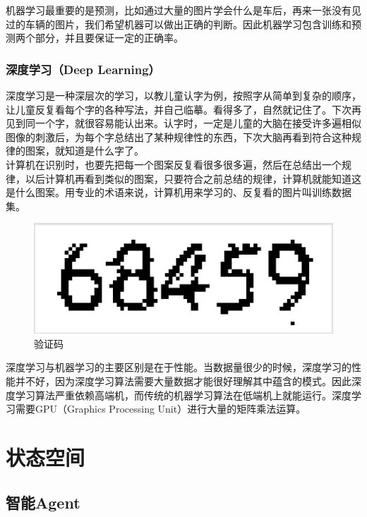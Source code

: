 机器学习最重要的是预测，比如通过大量的图片学会什么是车后，再来一张没有见过的车辆的图片，我们希望机器可以做出正确的判断。因此机器学习包含训练和预测两个部分，并且要保证一定的正确率。\\

\subsubsection{深度学习（Deep Learning）}

深度学习是一种深层次的学习，以教儿童认字为例，按照字从简单到复杂的顺序，让儿童反复看每个字的各种写法，并自己临摹。看得多了，自然就记住了。下次再见到同一个字，就很容易能认出来。认字时，一定是儿童的大脑在接受许多遍相似图像的刺激后，为每个字总结出了某种规律性的东西，下次大脑再看到符合这种规律的图案，就知道是什么字了。\\

计算机在识别时，也要先把每一个图案反复看很多很多遍，然后在总结出一个规律，以后计算机再看到类似的图案，只要符合之前总结的规律，计算机就能知道这是什么图案。用专业的术语来说，计算机用来学习的、反复看的图片叫训练数据集。

\begin{figure}[H]
    \centering
    \includegraphics[scale=0.5]{img/C1/1-1/2.png}
    \caption{验证码}
\end{figure}

深度学习与机器学习的主要区别是在于性能。当数据量很少的时候，深度学习的性能并不好，因为深度学习算法需要大量数据才能很好理解其中蕴含的模式。因此深度学习算法严重依赖高端机，而传统的机器学习算法在低端机上就能运行。深度学习需要GPU（Graphics Processing Unit）进行大量的矩阵乘法运算。

\newpage

\section{状态空间}

\subsection{智能Agent}

